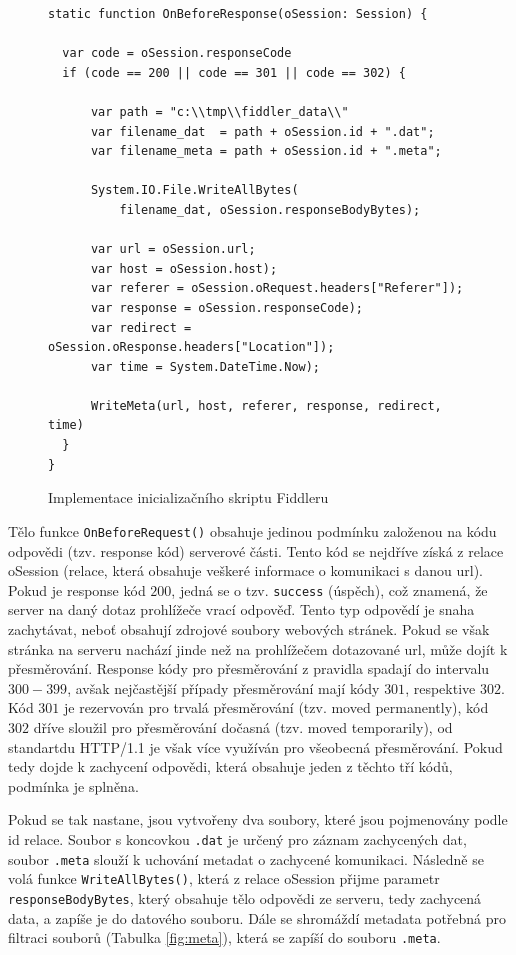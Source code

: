 \documentclass[thesis=M,czech,hidelinks]{FITthesis}[2013/05/06]
\begin{document}
\begin{figure}[h]               
	\begin{verbatim}
static function OnBeforeResponse(oSession: Session) {

  var code = oSession.responseCode
  if (code == 200 || code == 301 || code == 302) {

      var path = "c:\\tmp\\fiddler_data\\"
      var filename_dat  = path + oSession.id + ".dat";
      var filename_meta = path + oSession.id + ".meta";

      System.IO.File.WriteAllBytes(
          filename_dat, oSession.responseBodyBytes);
       
      var url = oSession.url;
      var host = oSession.host);
      var referer = oSession.oRequest.headers["Referer"]);
      var response = oSession.responseCode);
      var redirect = oSession.oResponse.headers["Location"]);
      var time = System.DateTime.Now);
      
      WriteMeta(url, host, referer, response, redirect, time)
  }
}
	\end{verbatim}      
	\caption{Implementace inicializačního skriptu Fiddleru}
	\label{snip:fiddler}
\end{figure}

Tělo funkce \texttt{OnBeforeRequest()} obsahuje jedinou podmínku založenou na kódu odpovědi (tzv. response kód) serverové části. Tento kód se nejdříve získá z relace oSession (relace, která obsahuje veškeré informace o komunikaci s danou url). Pokud je response kód $200$, jedná se o tzv. \texttt{success} (úspěch), což znamená, že server na daný dotaz prohlížeče vrací odpověď. Tento typ odpovědí je snaha zachytávat, neboť obsahují zdrojové soubory webových stránek. Pokud se však stránka na serveru nachází jinde než na prohlížečem dotazované url, může dojít k přesměrování. Response kódy pro přesměrování z pravidla spadají do intervalu $300-399$, avšak nejčastější případy přesměrování mají kódy $301$, respektive $302$. Kód $301$ je rezervován pro trvalá přesměrování (tzv. moved permanently), kód $302$ dříve sloužil pro přesměrování dočasná (tzv. moved temporarily), od standartdu HTTP/1.1 je však více využíván pro všeobecná přesměrování\cite{response_codes}. Pokud tedy dojde k zachycení odpovědi, která obsahuje jeden z těchto tří kódů, podmínka je splněna.

Pokud se tak nastane, jsou vytvořeny dva soubory, které jsou pojmenovány podle id relace. Soubor s koncovkou \texttt{.dat} je určený pro záznam zachycených dat, soubor \texttt{.meta} slouží k uchování metadat o zachycené komunikaci. Následně se volá funkce \texttt{WriteAllBytes()}, která z relace oSession přijme parametr \texttt{responseBodyBytes}, který obsahuje tělo odpovědi ze serveru, tedy zachycená data, a zapíše je do datového souboru. Dále se shromáždí metadata potřebná pro filtraci souborů (Tabulka \ref{fig:meta}), která se zapíší do souboru \texttt{.meta}. 
\end{document}
